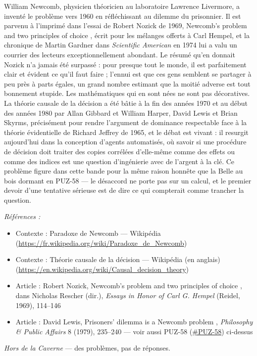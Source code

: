 \documentclass[11pt]{article}
\newenvironment{refs}{\par\small\noindent\emph{Références :}\begin{itemize}\setlength\itemsep{0pt}}{\end{itemize}\normalsize}
\begin{document}
\noindent William Newcomb, physicien théoricien au laboratoire Lawrence Livermore, a
inventé le problème vers 1960 en réfléchissant au dilemme du prisonnier. Il est parvenu à
l'imprimé dans l'essai de Robert Nozick de 1969, \og{} Newcomb's problem and two principles of
choice \fg{}, écrit pour les mélanges offerts à Carl Hempel, et la chronique de Martin Gardner dans
\textit{Scientific American} en 1974 lui a valu un courrier des lecteurs exceptionnellement
abondant. Le résumé qu'en donnait Nozick n'a jamais été surpassé : pour presque tout le monde,
il est parfaitement clair et évident ce qu'il faut faire ; l'ennui est que ces gens semblent se
partager à peu près à parts égales, un grand nombre estimant que la moitié adverse est tout
bonnement stupide. Les mathématiques qui en sont nées ne sont pas décoratives. La théorie
causale de la décision a été bâtie à la fin des années 1970 et au début des années 1980 par
Allan Gibbard et William Harper, David Lewis et Brian Skyrms, précisément pour rendre l'argument
de dominance respectable face à la théorie évidentielle de Richard Jeffrey de 1965, et le débat
est vivant : il resurgit aujourd'hui dans la conception d'agents automatisés, où savoir si une
procédure de décision doit traiter des copies corrélées d'elle-même comme des effets ou comme
des indices est une question d'ingénierie avec de l'argent à la clé. Ce problème figure dans
cette bande pour la même raison honnête que la Belle au bois dormant en PUZ-58 --- le désaccord
ne porte pas sur un calcul, et le premier devoir d'une tentative sérieuse est de dire ce qui
compterait comme trancher la question.

\begin{refs}
\item Contexte : Paradoxe de Newcomb --- Wikipédia (\url{https://fr.wikipedia.org/wiki/Paradoxe_de_Newcomb})
\item Contexte : Théorie causale de la décision --- Wikipédia (en anglais) (\url{https://en.wikipedia.org/wiki/Causal_decision_theory})
\item Article : Robert Nozick, \og{} Newcomb's problem and two principles of choice \fg{}, dans Nicholas Rescher (dir.), \textit{Essays in Honor of Carl G. Hempel} (Reidel, 1969), 114--146
\item Article : David Lewis, \og{} Prisoners' dilemma is a Newcomb problem \fg{}, \textit{Philosophy \& Public Affairs} 8 (1979), 235--240 --- voir aussi PUZ-58 (\url{#PUZ-58}) ci-dessus
\end{refs}

\bigskip


\vfill
\noindent\emph{Hors de la Caverne} --- des probl\`emes, pas de r\'eponses.
\end{document}
